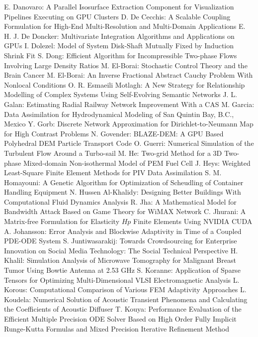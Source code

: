 \documentclass[10pt, A4]{article}%
\begin{document}
{E. Danovaro}: {A Parallel Isosurface Extraction Component for Visualization Pipelines Executing on GPU Clusters}
{D. De Cecchis}: {A Scalable Coupling Formulation for High-End Multi-Resolution and Multi-Domain Applications}
{E. H. J. De Doncker}: {Multivariate Integration Algorithms and Applications on GPUs}
{I. Dolezel}: {Model of System Disk-Shaft Mutually Fixed by Induction Shrink Fit}
{S. Dong}: {Efficient Algorithm for Incompressible Two-phase Flows Involving Large Density Ratios}
{M. El-Borai}: {Stochastic Control Theory and the Brain Cancer}
{M. El-Borai}: {An Inverse Fractional Abstract Cauchy Problem With Nonlocal Conditions}
{O. R. Esmaeili Motlagh}: {A New Strategy for Relationship Modelling of Complex Systems Using Self-Evolving Semantic Networks}
{J. L. Galan}: {Estimating Radial Railway Network Improvement With a CAS}
{M. Garcia}: {Data Assimilation for Hydrodynamical Modeling of San Quintin Bay, B.C., Mexico}
{Y. Gorb}: {Discrete Network Approximation for Dirichlet-to-Neumann Map for High Contrast Problems}
{N. Govender}: {BLAZE-DEM: A GPU Based Polyhedral DEM Particle Transport Code}
{O. Guerri}: {Numerical Simulation of the Turbulent Flow Around a Turbo-sail}
{M. He}: {Two-grid Method for a 3D Two-phase Mixed-domain Non-isothermal Model of PEM Fuel Cell}
{J. Heys}: {Weighted Least-Square Finite Element Methods for PIV Data Assimilation}
{S. M. Homayouni}: {A Genetic Algorithm for Optimization of Scheudling of Container Handling Equipment}
{N. Hussen Al-Khalidy}: {Designing Better Buildings With Computational Fluid Dynamics Analysis}
{R. Jha}: {A Mathematical Model for Bandwidth Attack Based on Game Theory for WiMAX Network}
{C. Jhurani}: {A Matrix-free Formulation for Elasticity $Hp$ Finite Elements Using NVIDIA CUDA}
{A. Johansson}: {Error Analysis and Blockwise Adaptivity in Time of a Coupled PDE-ODE System}
{S. Juntiwasarakij}: {Towards Crowdsourcing for Enterprise Innovation on Social Media Technology: The Social Technical Perspective}
{H. Khalil}: {Simulation Analysis of Microwave Tomography for Malignant Breast Tumor Using Bowtie Antenna at 2.53 GHz}
{S. Koranne}: {Application of Sparse Tensors for Optimizing Multi-Dimensional VLSI Electromagnetic Analysis}
{L. Korous}: {Computational Comparison of Various FEM Adaptivity Approaches}
{L. Koudela}: {Numerical Solution of Acoustic Transient Phenomena and Calculating the Coefficients of Acoustic Diffuser}
{T. Kouya}: {Performance Evaluation of the Efficient Multiple Precision ODE Solver Based on High Order Fully Implicit Runge-Kutta Formulas and Mixed Precision Iterative Refinement Method}
\end{document}
